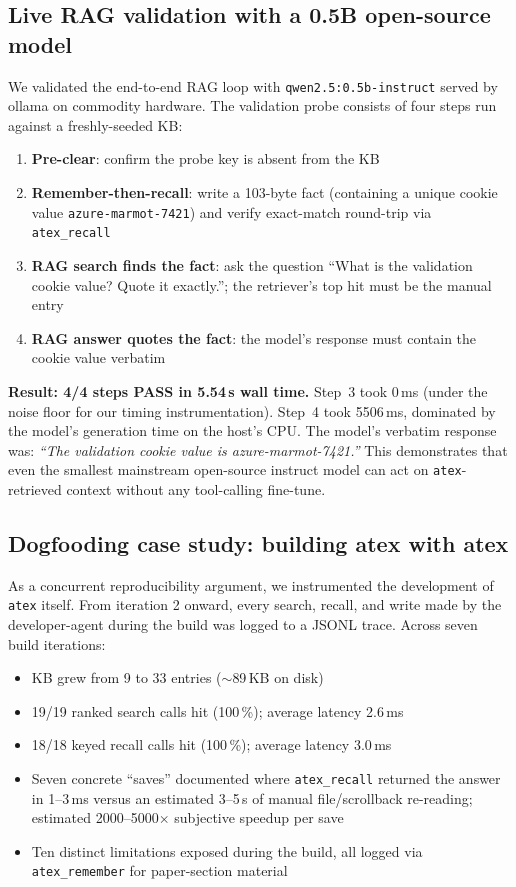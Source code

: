 \documentclass[10pt,letterpaper]{article}
\begin{document}
\subsection{Live RAG validation with a 0.5B open-source model}

We validated the end-to-end RAG loop with \texttt{qwen2.5:0.5b-instruct} served by ollama on commodity hardware. The validation probe consists of four steps run against a freshly-seeded KB:

\begin{enumerate}[leftmargin=*]
\item \textbf{Pre-clear}: confirm the probe key is absent from the KB
\item \textbf{Remember-then-recall}: write a 103-byte fact (containing a unique cookie value \texttt{azure-marmot-7421}) and verify exact-match round-trip via \texttt{atex\_recall}
\item \textbf{RAG search finds the fact}: ask the question ``What is the validation cookie value? Quote it exactly.''; the retriever's top hit must be the manual entry
\item \textbf{RAG answer quotes the fact}: the model's response must contain the cookie value verbatim
\end{enumerate}

\textbf{Result: 4/4 steps PASS in 5.54\,s wall time.} Step~3 took 0\,ms (under the noise floor for our timing instrumentation). Step~4 took 5506\,ms, dominated by the model's generation time on the host's CPU. The model's verbatim response was: \emph{``The validation cookie value is azure-marmot-7421.''} This demonstrates that even the smallest mainstream open-source instruct model can act on \texttt{atex}-retrieved context without any tool-calling fine-tune.

\subsection{Dogfooding case study: building atex with atex}

As a concurrent reproducibility argument, we instrumented the development of \texttt{atex} itself. From iteration 2 onward, every search, recall, and write made by the developer-agent during the build was logged to a JSONL trace. Across seven build iterations:

\begin{itemize}[leftmargin=*]
\item KB grew from 9 to 33 entries ($\sim$89\,KB on disk)
\item 19/19 ranked search calls hit (100\,\%); average latency 2.6\,ms
\item 18/18 keyed recall calls hit (100\,\%); average latency 3.0\,ms
\item Seven concrete ``saves'' documented where \texttt{atex\_recall} returned the answer in 1--3\,ms versus an estimated 3--5\,s of manual file/scrollback re-reading; estimated 2000--5000$\times$ subjective speedup per save
\item Ten distinct limitations exposed during the build, all logged via \texttt{atex\_remember} for paper-section material
\end{itemize}
\end{document}
